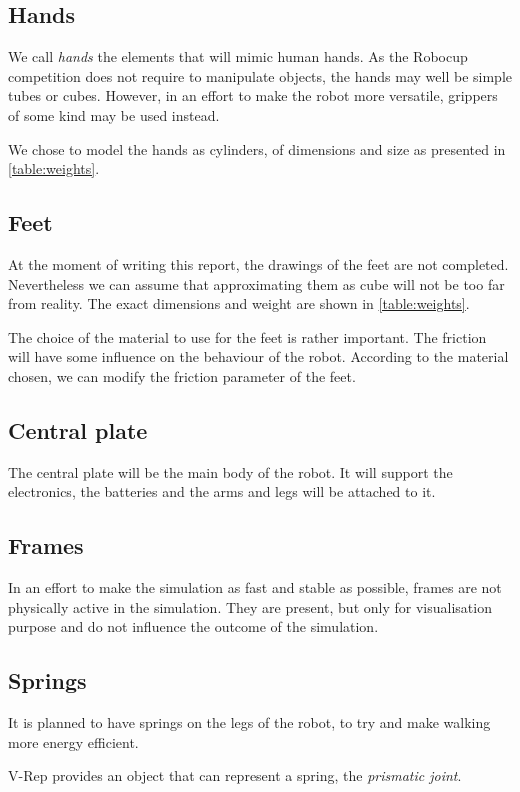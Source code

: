\subsection{Hands}
We call \emph{hands} the elements that will mimic human hands. As the Robocup competition does not require to manipulate objects, the hands may well be simple tubes or cubes. However, in an effort to make the robot more versatile, grippers of some kind may be used instead.

We chose to model the hands as cylinders, of dimensions and size as presented in \cref{table:weights}.

\subsection{Feet}
At the moment of writing this report, the drawings of the feet are not completed. Nevertheless we can assume that approximating them as cube will not be too far from reality. The exact dimensions and weight are shown in \cref{table:weights}.

The choice of the material to use for the feet is rather important. The friction will have some influence on the behaviour of the robot. According to the material chosen, we can modify the friction parameter of the feet.

\subsection{Central plate}
The central plate will be the main body of the robot. It will support the electronics, the batteries and the arms and legs will be attached to it.

\subsection{Frames}
In an effort to make the simulation as fast and stable as possible, frames are not physically active in the simulation. They are present, but only for visualisation purpose and do not influence the outcome of the simulation.

\subsection{Springs}
It is planned to have springs on the legs of the robot, to try and make walking more energy efficient. 

V-Rep provides an object that can represent a spring, the \emph{prismatic joint}.

